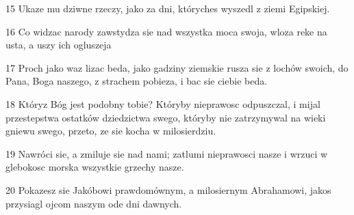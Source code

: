 \par 15 Ukaze mu dziwne rzeczy, jako za dni, któryches wyszedl z ziemi Egipskiej.
\par 16 Co widzac narody zawstydza sie nad wszystka moca swoja, wloza reke na usta, a uszy ich ogluszeja
\par 17 Proch jako waz lizac beda, jako gadziny ziemskie rusza sie z lochów swoich, do Pana, Boga naszego, z strachem pobieza, i bac sie ciebie beda.
\par 18 Któryz Bóg jest podobny tobie? Któryby nieprawosc odpuszczal, i mijal przestepstwa ostatków dziedzictwa swego, któryby nie zatrzymywal na wieki gniewu swego, przeto, ze sie kocha w milosierdziu.
\par 19 Nawróci sie, a zmiluje sie nad nami; zatlumi nieprawosci nasze i wrzuci w glebokosc morska wszystkie grzechy nasze.
\par 20 Pokazesz sie Jakóbowi prawdomównym, a milosiernym Abrahamowi, jakos przysiagl ojcom naszym ode dni dawnych.


